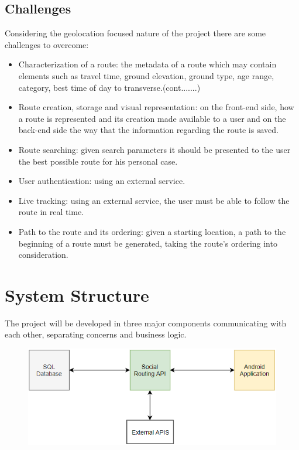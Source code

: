 \documentclass{article}
\begin{document}
        \subsection{Challenges}
            
            Considering the geolocation focused nature of the project there are some challenges to overcome:

            \begin{itemize}
                \item Characterization of a route: the metadata of a route which may contain elements such as travel time, ground elevation, ground type, age range, category, best time of day to transverse.(cont.......) 
                \item Route creation, storage and visual representation: on the front-end side, how a route is represented and its creation made available to a user and on the back-end side the way that the information regarding the route is saved.
                \item Route searching: given search parameters it should be presented to the user the best possible route for his personal case.  
                \item User authentication: using an external service.
                \item Live tracking: using an external service, the user must be able to follow the route in real time.
                \item Path to the route and its ordering: given a starting location, a path to the beginning of a route must be generated, taking the route's ordering into consideration.
            \end{itemize}

    \section{System Structure}
        The project will be developed in three major components communicating with each other, separating concerns and business logic.
        
        \begin{figure}[h]
            \includegraphics[width=\textwidth]{images/dblocos.png}
        \end{figure} 
\end{document}
